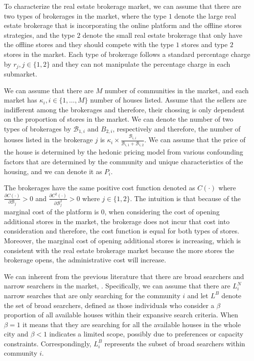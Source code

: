 \documentclass[12pt]{article}
\begin{document}
To characterize the real estate brokerage market, we can assume that there are two types of brokerages in the market, where the type $1$ denote the large real estate brokerage that is incorporating the online platform and the offline stores strategies, and the type $2$ denote the small real estate brokerage that only have the offline stores and they should compete with the type $1$ stores and type $2$ stores in the market. Each type of brokerage follows a standard percentage charge by $r_j, j \in \{1, 2\}$ and they can not manipulate the percentage charge in each submarket.

We can assume that there are $M$ number of communities in the market, and each market has $\kappa_i, i \in \{1, \ldots, M\}$ number of houses listed. Assume that the sellers are indifferent among the brokerages and therefore, their chossing is only dependent on the proportion of stores in the market. We can denote the number of two types of brokerages by $\mathcal{B}_{1, i}$ and $B_{2, i}$, respectively and therefore, the number of houses listed in the brokerage $j$ is $\kappa_{i} \times \frac{\mathcal{B}_{i, i}}{\mathcal{B}_{i, 1} + \mathcal{B}_{i, 2}}$. We can assume that the price of the house is determined by the hedonic pricing model from various confounding factors that are determined by the community and unique characteristics of the housing, and we can denote it as $P_i$. %

The brokerages have the same positive cost function denoted as $C(\cdot)$ where $\frac{\partial C(\cdot)}{\partial \mathcal{B}_{j}} > 0$ and $\frac{\partial C^2(\cdot)}{\partial \mathcal{B}_{j}^2} > 0$ where $j \in \{1, 2\}$. The intuition is that because of the marginal cost of the platform is $0$, when considering the cost of opening additional stores in the market, the brokerage does not incur that cost into consideration and therefore, the cost function is equal for both types of stores. Moreover, the marginal cost of opening additional stores is increasing, which is consistent with the real estate brokerage market because the more stores the brokerage opens, the administrative cost will increase.

We can inherent from the previous literature that there are broad searchers and narrow searchers in the market, \citep{10.1257/aer.20141772}. Specifically, we can assume that there are $L^N_i$ narrow searches that are only searching for the community $i$ and let $L^B$ denote the set of broad searchers, defined as those individuals who consider a $\beta$ proportion of all available houses within their expansive search criteria. When $\beta = 1$ it means that they are searching for all the available houses in the whole city and $\beta < 1$ indicates a limited scope, possibly due to preferences or capacity constraints. Correspondingly, $L^B_i$ represents the subset of broad searchers within community $i$.
\end{document}
